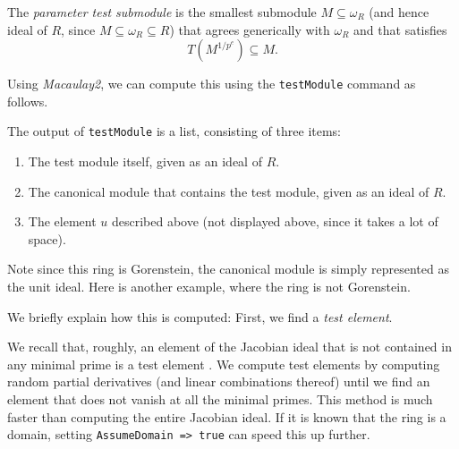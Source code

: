 \documentclass{amsart}
\newcommand{\pedro}[2][]
{\todo[linecolor=blue,backgroundcolor=blue!10,caption={}, #1]{#2}}
\begin{document}
\begin{definition}
   The \emph{parameter test submodule} is the smallest submodule $M \subseteq \omega_R$ (and hence ideal of $R$, since $M \subseteq \omega_R \subseteq R$) that agrees generically with $\omega_R$ and that satisfies
   \pedro{What is the quantifier for $e$ here?}
\[
T (M^{1/p^e}) \subseteq M.
\]
\end{definition}


Using \emph{Macaulay2}, we can compute this using the \texttt{testModule} command as follows.

\medskip
{\small
{}
}\medskip

The output of \texttt{testModule} is a list, consisting of three items:
\begin{enumerate}[(1)]
\item The test module itself, given as an ideal of $R$.
\item The canonical module that contains the test module, given as an ideal of $R$.
\item The element $u$ described above (not displayed above, since it takes a lot of space).
\end{enumerate}

Note since this ring is Gorenstein, the canonical module is simply represented as the unit ideal. Here is another example, where the ring is not Gorenstein.

\medskip
{\small
{}
}\medskip

We briefly explain how this is computed:  First, we find a \emph{test element}.
\begin{remark}
\label{rem.ComputationOfTestElements}
We recall that, roughly, an element of the Jacobian ideal that is not contained in any minimal prime is a test element \cite{HochsterFoundations}.  We compute test elements by computing random partial derivatives (and linear combinations thereof) until we find an element that does not vanish at all the minimal primes.  This method is much faster than computing the entire Jacobian ideal.  If it is known that the ring is a domain, setting \texttt{AssumeDomain => true} can speed this up further.
\end{remark}
\end{document}
